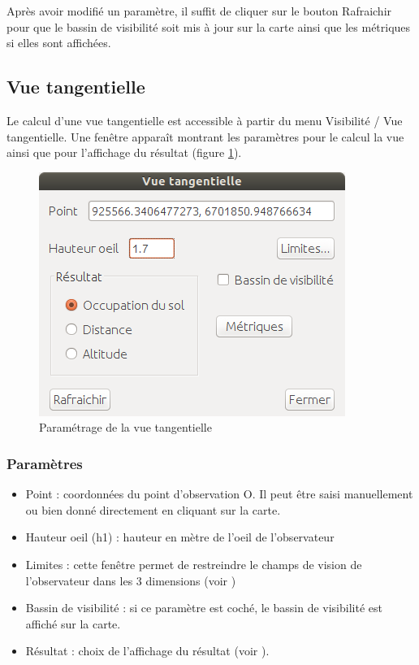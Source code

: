 \documentclass{report}
\begin{document}
Après avoir modifié un paramètre, il suffit de cliquer sur le bouton Rafraichir pour que le bassin de visibilité soit mis à jour sur la carte ainsi que les métriques si elles sont affichées.

\subsection{Vue tangentielle}

Le calcul d'une vue tangentielle est accessible à partir du menu Visibilité / Vue tangentielle. Une fenêtre apparaît montrant les paramètres pour le calcul la vue ainsi que pour l'affichage du résultat (figure \ref{viewtan_param}). 

\begin{figure}[H]
	\includegraphics[scale=0.5]{img/viewtan_dlg-fr.png} 
	\caption{Paramétrage de la vue tangentielle}
	\label{viewtan_param}
\end{figure}

\subsubsection{Paramètres}

\begin{itemize}
	\item Point : coordonnées du point d'observation O. Il peut être saisi manuellement ou bien donné directement en cliquant sur la carte.
	\item Hauteur oeil (h1) : hauteur en mètre de l'oeil de l'observateur
	\item Limites : cette fenêtre permet de restreindre le champs de vision de l'observateur dans les 3 dimensions (voir )
	\item Bassin de visibilité : si ce paramètre est coché, le bassin de visibilité est affiché sur la carte.
	\item Résultat : choix de l'affichage du résultat (voir ).
\end{itemize}
\end{document}
